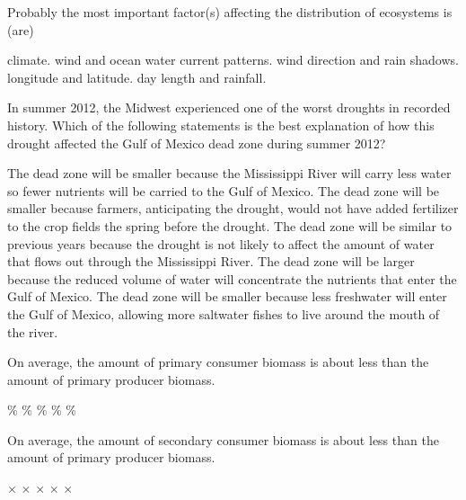 \question
Probably the most important factor(s) affecting the distribution of ecosystems is (are)

\begin{choices}
\correctchoice climate.%
\choice wind and ocean water current patterns.%
\choice wind direction and rain shadows.%
\choice longitude and latitude.%
\choice day length and rainfall.%
\end{choices}

\question
In summer 2012, the Midwest experienced one of the worst droughts in recorded history. Which of the following statements is the best explanation of how this drought affected the Gulf of Mexico dead zone during summer 2012?

\begin{choices}
\correctchoice The dead zone will be smaller because the Mississippi River will carry less water so fewer nutrients will be carried to the Gulf of Mexico.%
\choice The dead zone will be smaller because farmers, anticipating the drought, would not have added fertilizer to the crop fields the spring before the drought.%
\choice The dead zone will be similar to previous years because the drought is not likely to affect the amount of water that flows out through the Mississippi River.%
\choice The dead zone will be larger because the reduced volume of water will concentrate the nutrients that enter the Gulf of Mexico.%
\choice The dead zone will be smaller because less freshwater will enter the Gulf of Mexico, allowing more saltwater fishes to live around the mouth of the river.%
\end{choices}

\question
On average, the amount of primary consumer biomass is about \underline{\hspace{2cm}} less than the amount of primary producer biomass.

\begin{choices}
\%%
\%%
\%%
\%%
\%%
\end{choices}


\question
On average, the amount of secondary consumer biomass is about \underline{\hspace{2cm}} less than the amount of primary producer biomass. 
\begin{choices}
$\times$%
$\times$%
$\times$%
$\times$%
$\times$%
\end{choices}

